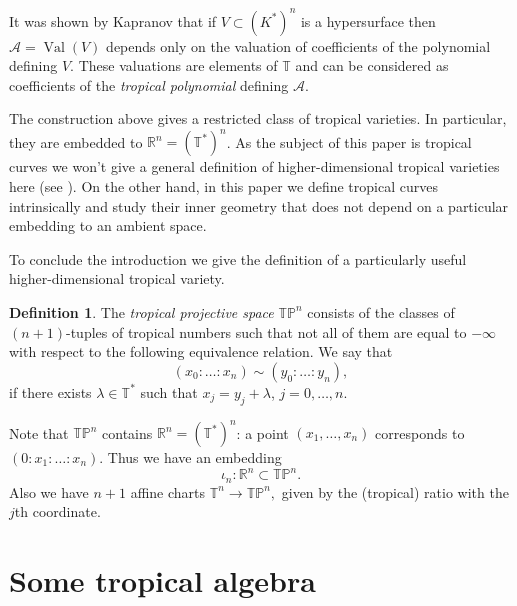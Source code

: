 \documentclass[12pt]{amsart}
\theoremstyle{plain}
\theoremstyle{definition}
\newtheorem{definition}[theorem]{Definition}
\theoremstyle{remark}
\newcommand{\R}{\mathbb R}    %
\newcommand{\PP}{\mathbb P}   %
\newcommand{\T}{\mathbb T}    %
\newcommand{\<}{\langle}   %
\renewcommand{\>}{\rangle} %
\newcommand{\Val}{\operatorname{Val}}
\newcommand{\am}{{\mathcal{A}}}
\begin{document}
It was shown by Kapranov \cite{Ka} that if $V\subset(K^*)^n$
is a hypersurface then $\am=\Val(V)$ depends only on the valuation
of coefficients of the polynomial defining $V$. These valuations
are elements of $\T$ and can be considered as coefficients of
the {\em tropical polynomial} defining $\am$.

The construction above gives a restricted class of tropical
varieties. In particular, they are embedded to $\R^n=(\T^*)^n$. As
the subject of this paper is tropical curves we won't give
a general definition of higher-dimensional tropical varieties
here (see \cite{Mi-ICM}). On the other hand, in this paper we define tropical
curves intrinsically and study their inner geometry that does
not depend on a particular embedding to an ambient space.

To conclude the introduction we give the definition of a particularly
useful higher-dimensional tropical variety.
\begin{definition}
The {\em tropical projective space} $\T\PP^n$ consists of the classes
of $(n+1)$-tuples of tropical numbers such
that not all of them are equal to $-\infty$
with respect to the following equivalence relation.
We say that $$(x_0:\dots:x_n)\sim (y_0:\dots:y_n),$$
if there exists $\lambda\in\T^*$ such that $x_j=y_j+\lambda$, $j=0,\dots,n$.
\end{definition}

Note that $\T\PP^n$ contains $\R^n=(\T^*)^n$:
a point $(x_1,\dots,x_n)$ corresponds to $(0:x_1:\dots:x_n)$.
Thus we have an embedding
\begin{equation}\label{Rn}
\iota_n:\R^n\subset\T\PP^n.
\end{equation}
Also we have $n+1$ affine charts
$\T^n\to\T\PP^n,$ given by the (tropical) ratio with the $j$th coordinate.

\section{Some tropical algebra}
\end{document}

